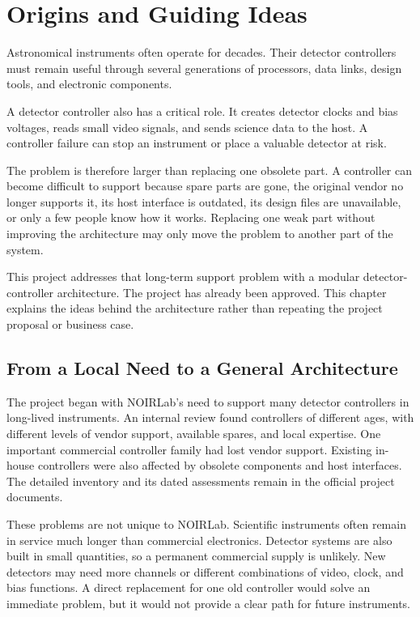 \chapter{Origins and Guiding Ideas}
\label{chap:origins}

Astronomical instruments often operate for decades. Their detector controllers must remain useful through several generations of processors, data links, design tools, and electronic components.

A detector controller also has a critical role. It creates detector clocks and bias voltages, reads small video signals, and sends science data to the host. A controller failure can stop an instrument or place a valuable detector at risk.

The problem is therefore larger than replacing one obsolete part. A controller can become difficult to support because spare parts are gone, the original vendor no longer supports it, its host interface is outdated, its design files are unavailable, or only a few people know how it works. Replacing one weak part without improving the architecture may only move the problem to another part of the system.

This project addresses that long-term support problem with a modular detector-controller architecture. The project has already been approved. This chapter explains the ideas behind the architecture rather than repeating the project proposal or business case.

\section{From a Local Need to a General Architecture}

The project began with NOIRLab's need to support many detector controllers in long-lived instruments. An internal review found controllers of different ages, with different levels of vendor support, available spares, and local expertise. One important commercial controller family had lost vendor support. Existing in-house controllers were also affected by obsolete components and host interfaces. The detailed inventory and its dated assessments remain in the official project documents.

These problems are not unique to NOIRLab. Scientific instruments often remain in service much longer than commercial electronics. Detector systems are also built in small quantities, so a permanent commercial supply is unlikely. New detectors may need more channels or different combinations of video, clock, and bias functions. A direct replacement for one old controller would solve an immediate problem, but it would not provide a clear path for future instruments.

